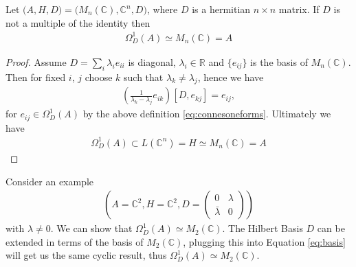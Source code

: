 \begin{lemma}
    Let $\big(A, H, D\big) = \big(M_n(\mathbb{C}), \mathbb{C}^n, D\big)$, where
    $D$ is a hermitian $n\times n$ matrix. If $D$ is not a multiple of the
    identity then
    \begin{align}
        \Omega _D ^1 (A)  \simeq  M_n(\mathbb{C}) = A
    \end{align}
\end{lemma}
\begin{proof}
    Assume $D = \sum _i \lambda _i e_{ii}$ is diagonal, $\lambda _i \in \mathbb{R}$ and
    $\{e_{ij}\}$ is the basis of $M_n(\mathbb{C})$. Then for fixed $i$, $j$ choose $k$
    such that $\lambda _k \neq \lambda _j$, hence we have
    \begin{align} \label{eq:basis}
        \left(\frac{1}{\lambda _k - \lambda _j} e_{ik}\right) [D, e_{kj}] =
        e_{ij},
    \end{align}
    for $e_{ij}\in \Omega _D ^1 (A)$ by the above definition
    \eqref{eq:connesoneforms}. Ultimately we have
    \begin{align}
        \Omega _D ^1
    (A) \subset L(\mathbb{C}^n) = H \simeq M_n(\mathbb{C}) = A
    \end{align}
\end{proof}

     Consider an example
     \begin{align}
             \left(A=\mathbb{C}^2, H=\mathbb{C}^2,
                 D = \begin{pmatrix} 0 & \lambda \\ \bar{\lambda} & 0
         \end{pmatrix}\right)
     \end{align}
     with $\lambda \neq 0$. We can show that $\Omega _D^1(A)
     \simeq M_2(\mathbb{C})$. The Hilbert Basis $D$ can be extended in terms of
    the basis of $M_2(\mathbb{C})$, plugging this into Equation
    \eqref{eq:basis} will get us the same cyclic result, thus
    $\Omega _D^1(A) \simeq M_2(\mathbb{C})$.
\

